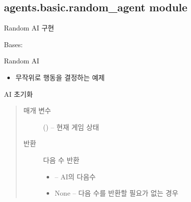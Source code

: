 \documentclass[letterpaper,10pt,english]{sphinxmanual}
\begin{document}
\subsection{agents.basic.random\_agent module}
\label{\detokenize{agents.basic:agents-basic-random-agent-module}}\label{\detokenize{agents.basic:module-agents.basic.random_agent}}
Random AI 구현

\begin{fulllineitems}
\label{\detokenize{agents.basic:agents.basic.random_agent.RandomAgent}}
Bases: {\hyperref[\detokenize{agents:agents.BaseAgent}]{}}

Random AI
\begin{itemize}
\item {} 
무작위로 행동을 결정하는 예제

\end{itemize}

\begin{fulllineitems}
\label{\detokenize{agents.basic:agents.basic.random_agent.RandomAgent.act}}
AI 초기화
\begin{quote}\begin{description}
\item[{매개 변수}] \leavevmode
{} ({\hyperref[\detokenize{scripts:scripts.run_game.State}]{}}) -- 현재 게임 상태

\item[{반환}] \leavevmode

다음 수 반환
\begin{itemize}
\item {} 
 -- AI의 다음수

\item {} 
None -- 다음 수를 반환할 필요가 없는 경우

\end{itemize}


\end{description}\end{quote}


\end{fulllineitems}
\end{fulllineitems}
\end{document}
